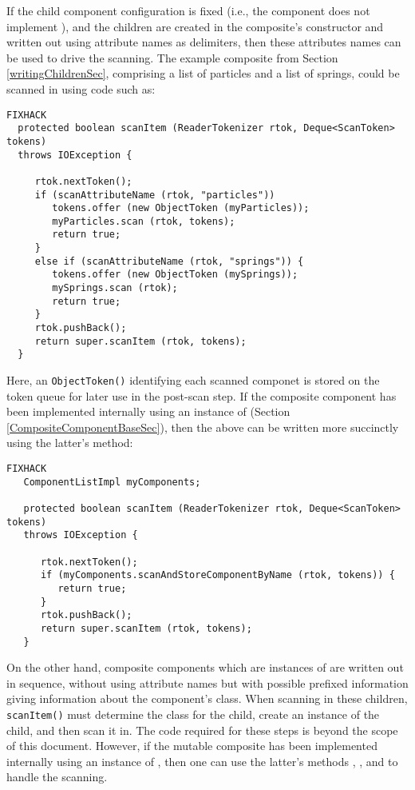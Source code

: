 \documentclass{article}
\begin{document}
If the child component configuration is fixed
(i.e., the component
does not implement
),
and the children are created in the composite's constructor
and written out using attribute names as delimiters,
then these attributes names can be used to drive the scanning.
The example composite from Section \ref{writingChildrenSec},
comprising a list of particles and a list of springs, 
could be scanned in using code such as:
\begin{lstlisting}FIXHACK
  protected boolean scanItem (ReaderTokenizer rtok, Deque<ScanToken> tokens)
  throws IOException {

     rtok.nextToken();
     if (scanAttributeName (rtok, "particles")) 
        tokens.offer (new ObjectToken (myParticles));
        myParticles.scan (rtok, tokens);
        return true;
     }
     else if (scanAttributeName (rtok, "springs")) {
        tokens.offer (new ObjectToken (mySprings));
        mySprings.scan (rtok);
        return true;
     }
     rtok.pushBack();     
     return super.scanItem (rtok, tokens);
  }
\end{lstlisting}
Here, an {\tt ObjectToken()} identifying each scanned componet is
stored on the token queue for later use in the post-scan step.  If the
composite component has been implemented internally using an instance
of  (Section
\ref{CompositeComponentBaseSec}), then the above can be written more
succinctly using the latter's
method:
\begin{lstlisting}FIXHACK
   ComponentListImpl myComponents; 

   protected boolean scanItem (ReaderTokenizer rtok, Deque<ScanToken> tokens)
   throws IOException {

      rtok.nextToken();
      if (myComponents.scanAndStoreComponentByName (rtok, tokens)) {
         return true;
      }
      rtok.pushBack();     
      return super.scanItem (rtok, tokens);
   }
\end{lstlisting}

On the other hand, composite components which are instances of
 are
written out in sequence, without using attribute names but with
possible prefixed information giving information about the component's
class. When scanning in these children, {\tt scanItem()} must
determine the class for the child, create an instance of the child,
and then scan it in. The code required for these steps is beyond the
scope of this document. However, if the mutable composite
has been implemented internally using an instance of
, then one can
use the latter's methods 
,
,
and 
to handle the scanning.
\end{document}
